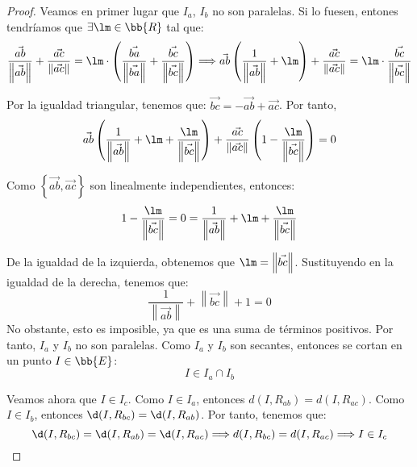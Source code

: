\begin{proof}
    Veamos en primer lugar que $I_a$, $I_b$ no son paralelas. Si lo fuesen,
    entones tendríamos que $\exists \lm \in \bb{R}$ tal que:
    \begin{equation*}
        \frac{\vec{ab}}{\left\|\vec{ab}\right\|} + \frac{\vec{ac}}{\left\|\vec{ac}\right\|} = \lm 
        \cdot \left(\frac{\vec{ba}}{\left\|\vec{ba}\right\|} + \frac{\vec{bc}}{\left\|\vec{bc}\right\|}\right)
        \Longrightarrow \vec{ab}\left(\frac{1}{\left\|\vec{ab}\right\|} + \lm\right)
        + \frac{\vec{ac}}{\left\|\vec{ac}\right\|} = \lm \cdot \frac{\vec{bc}}{\left\|\vec{bc}\right\|}
    \end{equation*}

    Por la igualdad triangular, tenemos que: $\vec{bc} = -\vec{ab} + \vec{ac}$. Por tanto,
    \begin{equation*}
        \vec{ab}\left(\frac{1}{\left\|\vec{ab}\right\|} + \lm + \frac{\lm}{\left\|\vec{bc}\right\|}\right)
        + \frac{\vec{ac}}{\left\|\vec{ac}\right\|}\left(1 - \frac{\lm}{\left\|\vec{bc}\right\|}\right) = 0
    \end{equation*}

    Como $\left\{\vec{ab},\vec{ac}\right\}$ son linealmente independientes, entonces:
    \begin{equation*}
        1 - \frac{\lm}{\left\|\vec{bc}\right\|} = 0 = \frac{1}{\left\|\vec{ab}\right\|} + \lm + \frac{\lm}{\left\|\vec{bc}\right\|}
    \end{equation*}

    De la igualdad de la izquierda, obtenemos que $\lm = \left\|\vec{bc}\right\|$. Sustituyendo en la igualdad de la derecha, tenemos que:
    \begin{equation*}
        \frac{1}{\left\|\vec{ab}\right\|} + \left\|\vec{bc}\right\| + 1 = 0
    \end{equation*}
    No obstante, esto es imposible, ya que es una suma de términos positivos. Por tanto, $I_a$ y $I_b$ no son paralelas.
    Como $I_a$ y $I_b$ son secantes, entonces se cortan en un punto $I\in \bb{E}$:
    \begin{equation*}
        I\in I_a\cap I_b
    \end{equation*}
    
    Veamos ahora que $I\in I_c$. Como $I\in I_a$, entonces $d(I, R_{ab})=d(I, R_{ac})$.
    Como $I\in I_b$, entonces $\d(I, R_{bc})=\d(I, R_{ab})$. Por tanto, tenemos que:
    \begin{equation*}
        \d(I, R_{bc})=\d(I, R_{ab})=\d(I, R_{ac}) \Longrightarrow d(I, R_{bc})=d(I, R_{ac}) \Longrightarrow I\in I_c
    \end{equation*}


\end{proof}
